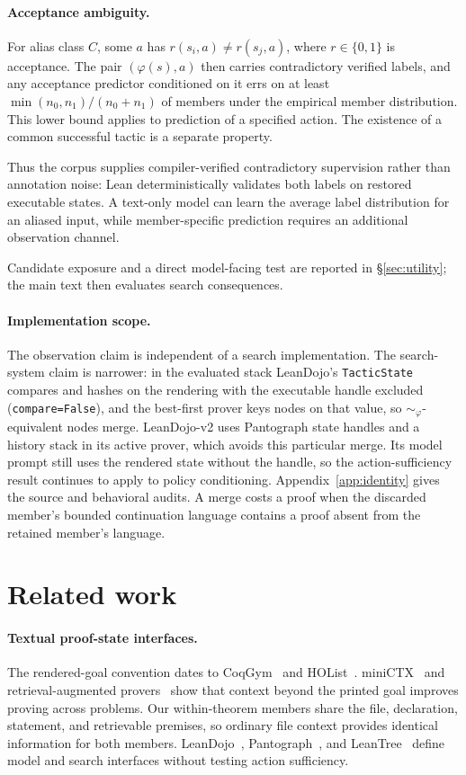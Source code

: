 \documentclass[11pt]{article}
\begin{document}
\paragraph{Acceptance ambiguity.}
For alias class $C$, some $a$ has $r(s_i,a)\neq r(s_j,a)$, where
$r\in\{0,1\}$ is acceptance. The pair $(\varphi(s),a)$ then
carries contradictory verified labels, and any acceptance predictor conditioned
on it errs on at least $\min(n_0,n_1)/(n_0+n_1)$ of members under the
empirical member distribution. This lower bound applies to prediction of a
specified action. The existence of a common successful tactic is a separate
property.

Thus the corpus supplies compiler-verified contradictory supervision rather
than annotation noise: Lean deterministically validates both labels on restored
executable states. A text-only model can learn the average label distribution
for an aliased input, while member-specific prediction requires an additional
observation channel.

Candidate exposure and a direct model-facing test are reported in
\S\ref{sec:utility}; the main text then evaluates search consequences.

\paragraph{Implementation scope.}
The observation claim is independent of a search implementation. The
search-system claim is narrower: in the evaluated stack LeanDojo's \texttt{TacticState}
compares and hashes on the rendering with the executable handle excluded
(\texttt{compare=False}), and the best-first prover keys nodes on that value,
so $\sim_\varphi$-equivalent nodes merge. LeanDojo-v2 uses Pantograph state
handles and a history stack in its active prover, which avoids this particular
merge. Its model prompt still uses the rendered state without the handle, so
the action-sufficiency result continues to apply to policy conditioning.
Appendix~\ref{app:identity} gives the source and behavioral audits. A merge
costs a proof when the discarded member's
bounded continuation language contains a proof absent from the retained
member's language.

\section{Related work}
\label{sec:related}

\paragraph{Textual proof-state interfaces.}
The rendered-goal convention dates to CoqGym~\cite{yang2019coqgym} and
HOList~\cite{bansal2019holist}. miniCTX~\cite{hu2024minictx} and
retrieval-augmented provers~\cite{yang2023leandojo} show that context beyond
the printed goal improves proving across problems. Our within-theorem members
share the file, declaration, statement, and retrievable premises, so ordinary
file context provides identical information for both members.
LeanDojo~\cite{yang2023leandojo},
Pantograph~\cite{aniva2025pantograph}, and LeanTree~\cite{kripner2025leantree}
define model and search interfaces without testing action sufficiency.
\end{document}
